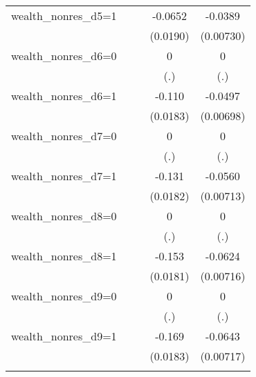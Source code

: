 \begin{table}[htbp]
\begin{tabular}{l*{4}{c}}
\addlinespace
wealth\_nonres\_d5=1&                  &                  &  -0.0652\sym{***}&  -0.0389\sym{***}\\
                &                  &                  & (0.0190)         &(0.00730)         \\
\addlinespace
wealth\_nonres\_d6=0&                  &                  &        0         &        0         \\
                &                  &                  &      (.)         &      (.)         \\
\addlinespace
wealth\_nonres\_d6=1&                  &                  &   -0.110\sym{***}&  -0.0497\sym{***}\\
                &                  &                  & (0.0183)         &(0.00698)         \\
\addlinespace
wealth\_nonres\_d7=0&                  &                  &        0         &        0         \\
                &                  &                  &      (.)         &      (.)         \\
\addlinespace
wealth\_nonres\_d7=1&                  &                  &   -0.131\sym{***}&  -0.0560\sym{***}\\
                &                  &                  & (0.0182)         &(0.00713)         \\
\addlinespace
wealth\_nonres\_d8=0&                  &                  &        0         &        0         \\
                &                  &                  &      (.)         &      (.)         \\
\addlinespace
wealth\_nonres\_d8=1&                  &                  &   -0.153\sym{***}&  -0.0624\sym{***}\\
                &                  &                  & (0.0181)         &(0.00716)         \\
\addlinespace
wealth\_nonres\_d9=0&                  &                  &        0         &        0         \\
                &                  &                  &      (.)         &      (.)         \\
\addlinespace
wealth\_nonres\_d9=1&                  &                  &   -0.169\sym{***}&  -0.0643\sym{***}\\
                &                  &                  & (0.0183)         &(0.00717)         \\
\addlinespace

\end{tabular}
\end{table}
